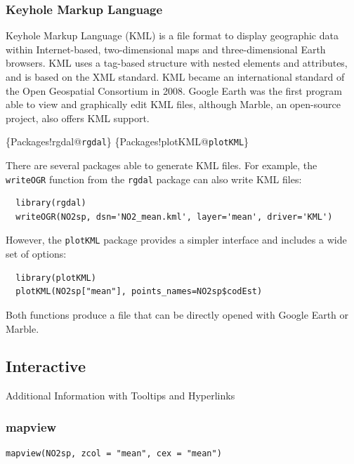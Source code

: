 \subsubsection{Keyhole Markup Language}
\label{sec:orgc29ddd7}

Keyhole Markup Language (KML) is a file format to display geographic
data within Internet-based, two-dimensional maps and three-dimensional
Earth browsers. KML uses a tag-based structure with nested elements
and attributes, and is based on the XML standard. KML became an
international standard of the Open Geospatial Consortium
in 2008. Google Earth was the first program able to view and
graphically edit KML files, although Marble, an open-source project,
also offers KML support.

\begin{LaTeX}
\index\{Packages!rgdal@\texttt{rgdal}\}
\index\{Packages!plotKML@\texttt{plotKML}\}
\end{LaTeX}

There are several packages able to generate KML files. For example,
the \texttt{writeOGR} function from the \texttt{rgdal} package can also write KML
files:
\lstset{language=r,label= ,caption= ,captionpos=b,numbers=none}
\begin{lstlisting}
  library(rgdal)
  writeOGR(NO2sp, dsn='NO2_mean.kml', layer='mean', driver='KML')
\end{lstlisting}

However, the \texttt{plotKML} package provides a simpler interface and
includes a wide set of options:
\lstset{language=r,label= ,caption= ,captionpos=b,numbers=none}
\begin{lstlisting}
  library(plotKML)
  plotKML(NO2sp["mean"], points_names=NO2sp$codEst)
\end{lstlisting}

Both functions produce a file that can be directly opened with Google
Earth or Marble.

\subsection{Interactive}
\label{sec:org344ccb1}
Additional Information with Tooltips and Hyperlinks
\subsubsection{mapview}
\label{sec:orgc0d1838}
\lstset{language=r,label= ,caption= ,captionpos=b,numbers=none}
\begin{lstlisting}
mapview(NO2sp, zcol = "mean", cex = "mean")
\end{lstlisting}

